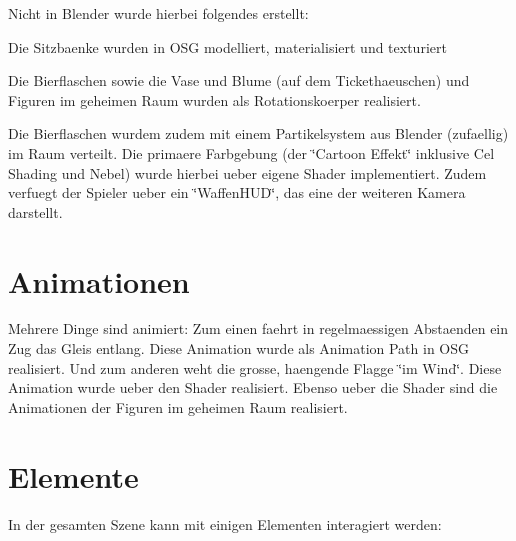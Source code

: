 Nicht in Blender wurde hierbei folgendes erstellt\+:
\begin{DoxyItemize}
\item Die Sitzbaenke wurden in O\+S\+G modelliert, materialisiert und texturiert
\item Die Bierflaschen sowie die Vase und Blume (auf dem Tickethaeuschen) und Figuren im geheimen Raum wurden als Rotationskoerper realisiert.
\begin{DoxyItemize}
\item Die Bierflaschen wurdem zudem mit einem Partikelsystem aus Blender (zufaellig) im Raum verteilt. Die primaere Farbgebung (der \char`\"{}\+Cartoon Effekt\char`\"{} inklusive Cel Shading und Nebel) wurde hierbei ueber eigene Shader implementiert. Zudem verfuegt der Spieler ueber ein \char`\"{}\+Waffen\+H\+U\+D\char`\"{}, das eine der weiteren Kamera darstellt.
\end{DoxyItemize}
\end{DoxyItemize}\hypertarget{index_Animationen}{}\section{Animationen}\label{index_Animationen}
Mehrere Dinge sind animiert\+: Zum einen faehrt in regelmaessigen Abstaenden ein Zug das Gleis entlang. Diese Animation wurde als Animation Path in O\+S\+G realisiert. Und zum anderen weht die grosse, haengende Flagge \char`\"{}im Wind\char`\"{}. Diese Animation wurde ueber den Shader realisiert. Ebenso ueber die Shader sind die Animationen der Figuren im geheimen Raum realisiert.\hypertarget{index_Interaktive}{}\section{Elemente}\label{index_Interaktive}
In der gesamten Szene kann mit einigen Elementen interagiert werden\+:
